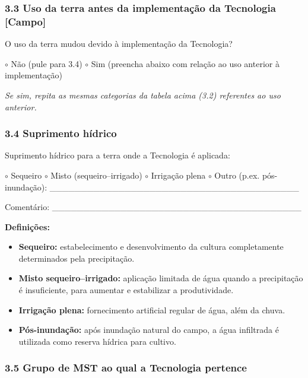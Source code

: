 \subsubsection{3.3 Uso da terra antes da implementação da Tecnologia {[Campo]}}\label{uso-da-terra-antes-da-implementauxe7uxe3o-da-tecnologia}

O uso da terra mudou devido à implementação da Tecnologia?

$\circ$ Não (pule para 3.4) $\circ$ Sim (preencha abaixo com relação ao uso anterior à implementação)

\emph{Se sim, repita as mesmas categorias da tabela acima (3.2) referentes ao uso anterior.}

\subsubsection{3.4 Suprimento hídrico}\label{suprimento-huxeddrico}

Suprimento hídrico para a terra onde a Tecnologia é aplicada:

$\circ$ Sequeiro $\circ$ Misto (sequeiro--irrigado) $\circ$ Irrigação plena $\circ$ Outro (p.ex. pós-inundação): \_\_\_\_\_\_\_\_\_\_\_\_\_\_\_\_\_\_\_\_\_\_\_\_\_\_\_\_\_\_\_\_\_\_\_\_\_\_\_\_

Comentário: \_\_\_\_\_\_\_\_\_\_\_\_\_\_\_\_\_\_\_\_\_\_\_\_\_\_\_\_\_\_\_\_\_\_\_\_\_\_\_\_

\textbf{Definições:}

\begin{itemize}
\tightlist
\item
  \textbf{Sequeiro:} estabelecimento e desenvolvimento da cultura completamente determinados pela precipitação.
\item
  \textbf{Misto sequeiro--irrigado:} aplicação limitada de água quando a precipitação é insuficiente, para aumentar e estabilizar a produtividade.
\item
  \textbf{Irrigação plena:} fornecimento artificial regular de água, além da chuva.
\item
  \textbf{Pós-inundação:} após inundação natural do campo, a água infiltrada é utilizada como reserva hídrica para cultivo.
\end{itemize}

\subsubsection{3.5 Grupo de MST ao qual a Tecnologia pertence}\label{grupo-de-mst-ao-qual-a-tecnologia-pertence}

